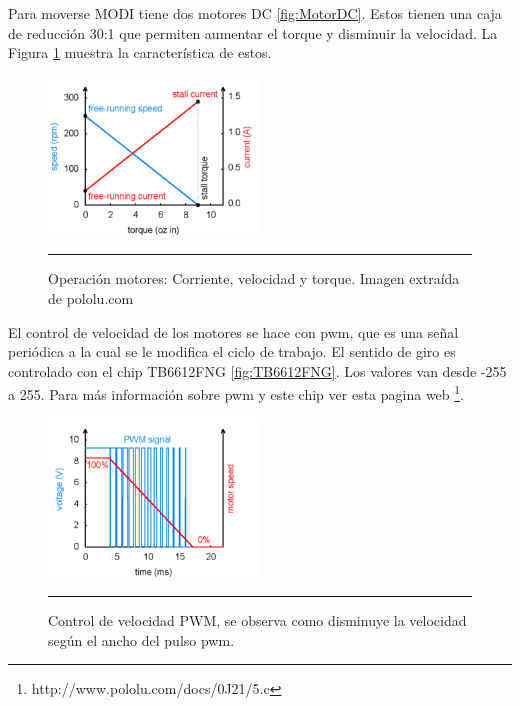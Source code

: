 Para moverse MODI tiene dos motores DC \ref{fig:MotorDC}. Estos tienen una caja de reducción 30:1 que permiten aumentar el torque y disminuir la velocidad. La Figura \ref{fig:DCMotor} muestra la característica de estos. 

\begin{figure}[htbp]
	\centering
		\includegraphics[width=0.5\textwidth]{./Figures/MODI/DCMotor.png}
		\rule{35em}{0.5pt}
	\caption[DCMotor]{Operación motores: Corriente, velocidad y torque. Imagen extraída de pololu.com}
	\label{fig:DCMotor}
\end{figure}

El control de velocidad de los motores se hace con pwm, que es una señal periódica a la cual se le modifica el ciclo de trabajo. El sentido de giro es controlado con el chip TB6612FNG \ref{fig:TB6612FNG}. Los valores van desde -255 a 255. Para más información sobre pwm y este chip ver esta pagina web \footnote{http://www.pololu.com/docs/0J21/5.c}.
\begin{figure}[htbp]
	\centering
		\includegraphics[width=0.5\textwidth]{./Figures/pwmchart.png}
		\rule{35em}{0.5pt}
	\caption[pwmChart]{Control de velocidad PWM, se observa como disminuye la velocidad según el ancho del pulso pwm.}
	\label{fig:pwmChart}
\end{figure}


